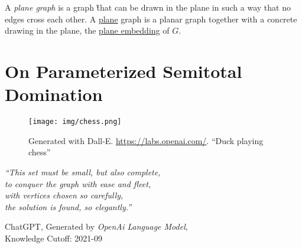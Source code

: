     

\begin{graphclass}

A \textit{plane graph} is a graph \G that can be drawn in the plane in such a way that no edges cross each other.
A \underline{plane} graph is a planar graph together with a concrete drawing in the plane, the \underline{plane embedding} of $G$. 

\end{graphclass}



\chapter{On Parameterized Semitotal Domination}\label{ch:semitotal-domination}

\vspace*{-50pt}

\begin{figure}[ht]
        \texttt{[image: img/chess.png]}
        \captionsetup{textformat=empty,labelformat=blank}
        \caption[Generated with Dalle-E. Knowledge Cutoff 09-2022]{Generated with Dall-E. \url{https://labs.openai.com/}. ``Duck playing chess''}
\end{figure}

\epigraph{\itshape ``This set must be small, but also complete, \\ 
to conquer the
graph with ease and fleet, \\
with vertices chosen so carefully, \\
the solution is found, so elegantly.''
}{ChatGPT, Generated by \emph{OpenAi Language Model}, \\
Knowledge Cutoff: 2021-09}

